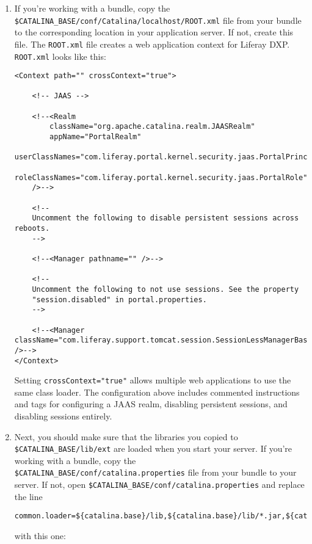 \begin{enumerate}
\def\labelenumi{\arabic{enumi}.}
\setcounter{enumi}{1}
\item
  If you're working with a bundle, copy the
  \texttt{\$CATALINA\_BASE/conf/Catalina/localhost/ROOT.xml} file from
  your bundle to the corresponding location in your application server.
  If not, create this file. The \texttt{ROOT.xml} file creates a web
  application context for Liferay DXP. \texttt{ROOT.xml} looks like
  this:

\begin{verbatim}
<Context path="" crossContext="true">

    <!-- JAAS -->

    <!--<Realm
        className="org.apache.catalina.realm.JAASRealm"
        appName="PortalRealm"
        userClassNames="com.liferay.portal.kernel.security.jaas.PortalPrincipal"
        roleClassNames="com.liferay.portal.kernel.security.jaas.PortalRole"
    />-->

    <!--
    Uncomment the following to disable persistent sessions across reboots.
    -->

    <!--<Manager pathname="" />-->

    <!--
    Uncomment the following to not use sessions. See the property
    "session.disabled" in portal.properties.
    -->

    <!--<Manager className="com.liferay.support.tomcat.session.SessionLessManagerBase" />-->
</Context>
\end{verbatim}

  Setting \texttt{crossContext="true"} allows multiple web applications
  to use the same class loader. The configuration above includes
  commented instructions and tags for configuring a JAAS realm,
  disabling persistent sessions, and disabling sessions entirely.
\item
  Next, you should make sure that the libraries you copied to
  \texttt{\$CATALINA\_BASE/lib/ext} are loaded when you start your
  server. If you're working with a bundle, copy the
  \texttt{\$CATALINA\_BASE/conf/catalina.properties} file from your
  bundle to your server. If not, open
  \texttt{\$CATALINA\_BASE/conf/catalina.properties} and replace the
  line

\begin{verbatim}
common.loader=${catalina.base}/lib,${catalina.base}/lib/*.jar,${catalina.home}/lib,${catalina.home}/lib/*.jar
\end{verbatim}

  with this one:


\end{enumerate}
